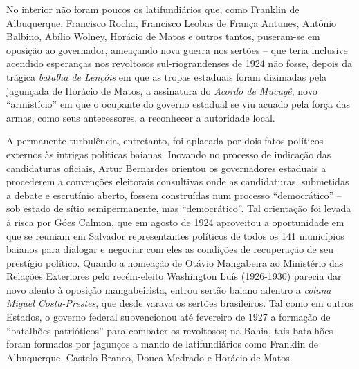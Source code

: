 No interior não foram poucos os latifundiários que, como Franklin de Albuquerque, Francisco Rocha, Francisco Leobas de França Antunes, Antônio Balbino, Abílio Wolney, Horácio de Matos e outros tantos, puseram-se em oposição ao governador, ameaçando nova guerra nos sertões -- que teria inclusive acendido esperanças nos revoltosos sul-riograndenses de 1924 não fosse, depois da trágica \textit{batalha de Lençóis} em que as tropas estaduais foram dizimadas pela jagunçada de Horácio de Matos, a assinatura do \textit{Acordo de Mucugê}, novo ``armistício'' em que o ocupante do governo estadual se viu acuado pela força das armas, como seus antecessores, a reconhecer a autoridade local.

A permanente turbulência, entretanto, foi aplacada por dois fatos políticos externos às intrigas políticas baianas. Inovando no processo de indicação das candidaturas oficiais, Artur Bernardes orientou os governadores estaduais a procederem a convenções eleitorais consultivas onde as candidaturas, submetidas a debate e escrutínio aberto, fossem construídas num processo ``democrático'' -- sob estado de sítio semipermanente, mas ``democrático''. Tal orientação foi levada à risca por Góes Calmon, que em agosto de 1924 aproveitou a oportunidade em que se reuniam em Salvador representantes políticos de todos os 141 municípios baianos para dialogar e negociar com eles as condições de recuperação de seu prestígio político. Quando a nomeação de Otávio Mangabeira ao Ministério das Relações Exteriores pelo recém-eleito Washington Luís (1926-1930) parecia dar novo alento à oposição mangabeirista, entrou sertão baiano adentro a \textit{coluna Miguel Costa-Prestes}, que desde varava os sertões brasileiros. Tal como em outros Estados, o governo federal subvencionou até fevereiro de 1927 a formação de ``batalhões patrióticos'' para combater os revoltosos; na Bahia, tais batalhões foram formados por jagunços a mando de latifundiários como Franklin de Albuquerque, Castelo Branco, Douca Medrado e Horácio de Matos. 

